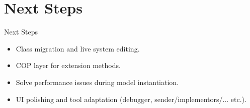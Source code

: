 \documentclass[xcolor=dvipsname, handout]{beamer} %
\begin{document}
\section{Next Steps}
\begin{frame}{Next Steps}
  \begin{itemize}
    \item Class migration and live system editing.
    \item COP layer for extension methods.
    \item Solve performance issues during model instantiation.
    \item UI polishing and tool adaptation (debugger, sender/implementors/... etc.).
  \end{itemize}
\end{frame}
\end{document}
